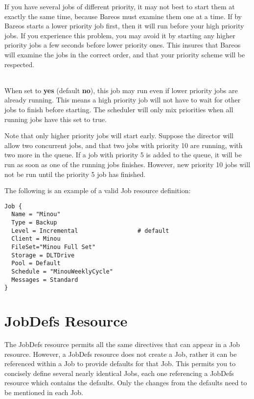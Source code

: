\begin{description}
If you have several jobs of different priority, it may not best to start
them at exactly the same time, because Bareos must examine them one at a
time.  If by Bareos starts a lower priority job first, then it will run
before your high priority jobs.  If you experience this problem, you may
avoid it by starting any higher priority jobs a few seconds before lower
priority ones.  This insures that Bareos will examine the jobs in the
correct order, and that your priority scheme will be respected.

\label{AllowMixedPriority}
\item [Allow Mixed Priority = {\textless}yes{\textbar}no{\textgreater}] \hfill \\
When
set to {\bf yes} (default {\bf no}), this job may run even if lower
priority jobs are already running.  This means a high priority job
will not have to wait for other jobs to finish before starting.
The scheduler will only mix priorities when all running jobs have
this set to true.

Note that only higher priority jobs will start early.  Suppose the
director will allow two concurrent jobs, and that two jobs with
priority 10 are running, with two more in the queue.  If a job with
priority 5 is added to the queue, it will be run as soon as one of
the running jobs finishes.  However, new priority 10 jobs will not
be run until the priority 5 job has finished.
\end{description}

The following is an example of a valid Job resource definition:

\footnotesize
\begin{verbatim}
Job {
  Name = "Minou"
  Type = Backup
  Level = Incremental                 # default
  Client = Minou
  FileSet="Minou Full Set"
  Storage = DLTDrive
  Pool = Default
  Schedule = "MinouWeeklyCycle"
  Messages = Standard
}
\end{verbatim}
\normalsize

\section{JobDefs Resource}
\label{DirectorResourceJobDefs}

The JobDefs resource permits all the same directives that can appear in a Job
resource. However, a JobDefs resource does not create a Job, rather it can be
referenced within a Job to provide defaults for that Job. This permits you to
concisely define several nearly identical Jobs, each one referencing a JobDefs
resource which contains the defaults. Only the changes from the defaults need to
be mentioned in each Job.

